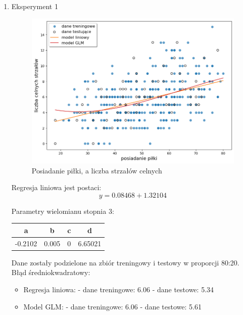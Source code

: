 \documentclass[11pt]{article}
\begin{document}
\begin{enumerate}[label=\alph*)]
  \item Eksperyment 1 \newline

    \begin{figure}[hbt]
    \includegraphics[scale=0.30]{shots_on_target.png}
    \caption{Posiadanie piłki, a liczba strzałów celnych}
    \end{figure}

     Regresja liniowa jest postaci:
    \begin{equation}
    y = 0.08468 + 1.32104
    \end{equation}

    Parametry wielomianu stopnia 3:

    \begin{center}
    \begin{tabular}{| c | c | c | c |}
    \hline
    a & b & c & d \\ \hline
    -0.2102 & 0.005 & 0 & 6.65021 \\ \hline
    \end{tabular}
    \end{center}

    Dane zostały podzielone na zbiór treningowy i testowy w proporcji 80:20.
    \newline
    \newline
    Błąd średniokwadratowy:
    \begin{itemize}
    \item Regresja liniowa: \newline
    - dane treningowe: 6.06 \newline
    - dane testowe: 5.34
    \item Model GLM: \newline
    - dane treningowe: 6.06 \newline
    - dane testowe: 5.61
    \end{itemize}


\end{enumerate}
\end{document}
